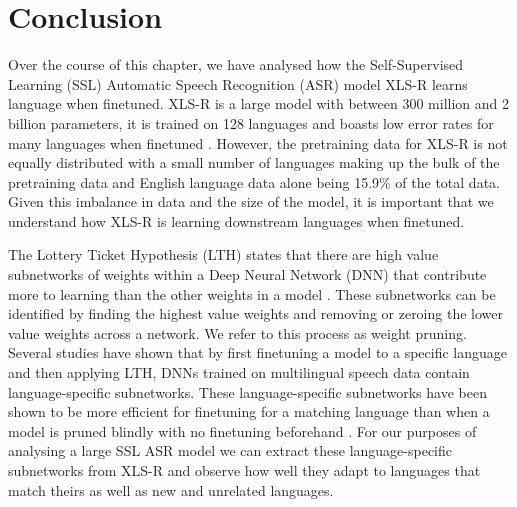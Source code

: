 \section{Conclusion}\label{pru_sec:conclusion}

Over the course of this chapter, we have analysed how the Self-Supervised Learning (SSL) Automatic Speech Recognition (ASR) model XLS-R \cite{babu2021xlsr} learns language when finetuned. XLS-R is a large model with between 300 million and 2 billion parameters, it is trained on 128 languages and boasts low error rates for many languages when finetuned \cite{FLEURS_XLSR_WHISPER}. However, the pretraining data for XLS-R is not equally distributed with a small number of languages making up the bulk of the pretraining data and English language data alone being 15.9\% of the total data. Given this imbalance in data and the size of the model, it is important that we understand how XLS-R is learning downstream languages when finetuned.

The Lottery Ticket Hypothesis (LTH) states that there are high value subnetworks of weights within a Deep Neural Network (DNN) that contribute more to learning than the other weights in a model \cite{frankle2018LTH}. These subnetworks can be identified by finding the highest value weights and removing or zeroing the lower value weights across a network. We refer to this process as weight pruning. Several studies have shown that by first finetuning a model to a specific language and then applying LTH, DNNs trained on multilingual speech data contain language-specific subnetworks. These language-specific subnetworks have been shown to be more efficient for finetuning for a matching language than when a model is pruned blindly with no finetuning beforehand \cite{Lu_Language_adap_xlsr, yang2023learning, PARP}. For our purposes of analysing a large SSL ASR model we can extract these language-specific subnetworks from XLS-R and observe how well they adapt to languages that match theirs as well as new and unrelated languages.

